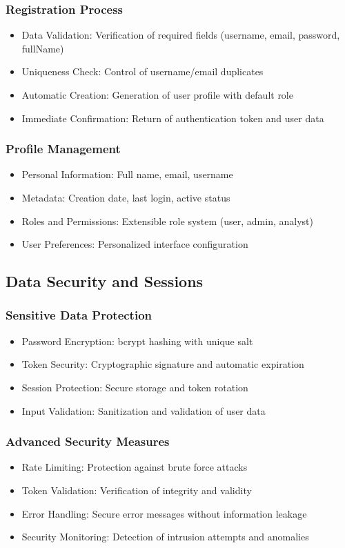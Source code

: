 \subsubsection{Registration Process}
\begin{itemize}
    \item Data Validation: Verification of required fields (username, email, password, fullName)
    \item Uniqueness Check: Control of username/email duplicates
    \item Automatic Creation: Generation of user profile with default role
    \item Immediate Confirmation: Return of authentication token and user data
\end{itemize}

\subsubsection{Profile Management}
\begin{itemize}
    \item Personal Information: Full name, email, username
    \item Metadata: Creation date, last login, active status
    \item Roles and Permissions: Extensible role system (user, admin, analyst)
    \item User Preferences: Personalized interface configuration
\end{itemize}

\subsection{Data Security and Sessions}
\subsubsection{Sensitive Data Protection}
\begin{itemize}
    \item Password Encryption: bcrypt hashing with unique salt
    \item Token Security: Cryptographic signature and automatic expiration
    \item Session Protection: Secure storage and token rotation
    \item Input Validation: Sanitization and validation of user data
\end{itemize}

\subsubsection{Advanced Security Measures}
\begin{itemize}
    \item Rate Limiting: Protection against brute force attacks
    \item Token Validation: Verification of integrity and validity
    \item Error Handling: Secure error messages without information leakage
    \item Security Monitoring: Detection of intrusion attempts and anomalies
\end{itemize}

